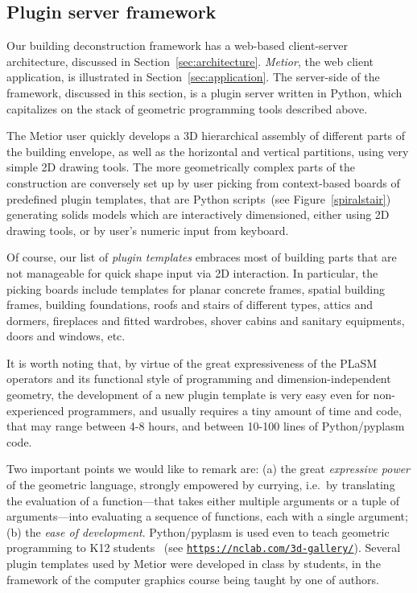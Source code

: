\documentclass[a4paper,twoside]{article}
\begin{document}
\subsection{Plugin server framework}

\noindent
Our building deconstruction framework  has a web-based client-server architecture,  discussed in Section~\ref{sec:architecture}.  \emph{Metior}, the web client application, is illustrated in Section~\ref{sec:application}. The server-side of the framework, discussed in this section, is a  plugin server written in Python, which capitalizes on the stack of geometric programming tools described above. 

The Metior user quickly develops a 3D hierarchical assembly of different parts of the building envelope, as well as the horizontal and vertical partitions, using very simple 2D drawing tools. The more geometrically complex parts of the construction are conversely set up by user picking from context-based boards of predefined plugin templates, that are Python scripts~(see Figure~\ref{spiralstair}) generating solids models which are interactively dimensioned, either using 2D drawing tools, or by user's numeric input from keyboard. 

Of course, our list of \emph{plugin templates} embraces most of building parts that are not manageable for quick shape input via 2D interaction. In particular, the picking boards include templates for planar concrete frames, spatial building frames, building foundations, roofs and stairs of different types, attics and dormers, fireplaces and fitted wardrobes, shover cabins and sanitary equipments, doors and windows, etc.

It is worth noting that, by virtue of the great expressiveness of the PLaSM operators and its functional style of programming and dimension-independent geometry, the development of a new plugin template is very easy even for non-experienced programmers, and usually requires a tiny amount of time and code, that may range between 4-8 hours, and between 10-100 lines of Python/pyplasm code. 

Two important points we would like to remark are: (a) the great \emph{expressive power} of the geometric language,  strongly empowered by  currying, i.e.~by translating the evaluation of a function---that takes either multiple arguments or a tuple of arguments---into evaluating a sequence of functions, each with a single argument; (b) the \emph{ease of development}. Python/pyplasm is used even to teach geometric programming to K12 students~\cite{ncLab} (see \href{https://nclab.com/3d-gallery/}{\texttt{https://nclab.com/3d-gallery/}}). 
Several plugin templates used by Metior were developed in class by students, in the framework of the computer  graphics course being taught by one of authors. 
\end{document}
